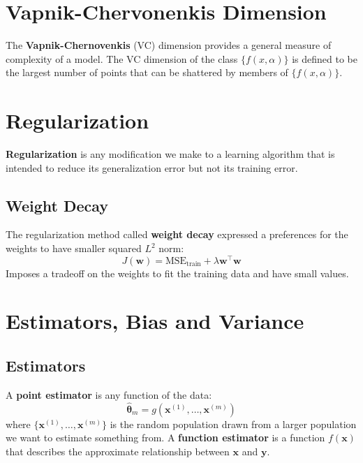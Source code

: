 \documentclass[12pt]{report}
\begin{document}
    \section{Vapnik-Chervonenkis Dimension}
        The \textbf{Vapnik-Chernovenkis} (VC) dimension provides a general measure of complexity of a model. The VC dimension of the class $\{f(x, \alpha)\}$ is defined to be the largest number of points that can be shattered by members of $\{f(x, \alpha)\}$.
        
    \section{Regularization}
        \textbf{Regularization} is any modification we make to a learning algorithm that is intended to reduce its generalization error but not its training error.
        \subsection{Weight Decay}
            The regularization method called \textbf{weight decay} expressed a preferences for the weights to have smaller squared $L^2$ norm:
            \begin{equation}
                J(\boldsymbol{w}) = \text{MSE}_{\text{train}} + \lambda\boldsymbol{w}^\top\boldsymbol{w}
            \end{equation}
            Imposes a tradeoff on the weights to fit the training data and have small values.
        
    \section{Estimators, Bias and Variance}
        \subsection{Estimators}
            A \textbf{point estimator} is any function of the data:
            \begin{equation}
                \hat{\boldsymbol{\theta}}_m = g(\boldsymbol{x}^{(1)}, \dots,\boldsymbol{x}^{(m)})
            \end{equation}
            where $\{\boldsymbol{x}^{(1)}, \dots,\boldsymbol{x}^{(m)}\}$ is the random population drawn from a larger population we want to estimate something from.
            A \textbf{function estimator} is a function $f(\boldsymbol{x})$ that describes the approximate relationship between $\boldsymbol{x}$ and $\boldsymbol{y}$.
\end{document}

